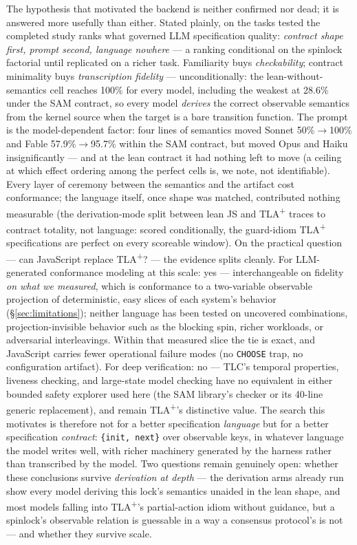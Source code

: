 \documentclass[11pt]{article}
\newcommand{\tlaplus}{TLA\texorpdfstring{\textsuperscript{+}}{+}}
\begin{document}
The hypothesis that motivated the backend is neither confirmed nor dead; it
is answered more usefully than either. Stated plainly, on the tasks tested
the completed study ranks what governed LLM specification quality:
\emph{contract shape first, prompt second, language nowhere} --- a ranking
conditional on the spinlock factorial until replicated on a richer task. Familiarity buys \emph{checkability};
contract minimality buys \emph{transcription fidelity} --- unconditionally:
the lean-without-semantics cell reaches 100\% for every model, including the
weakest at 28.6\% under the SAM contract, so every model \emph{derives} the
correct observable semantics from the kernel source when the target is a
bare transition function. The prompt is the model-dependent factor: four
lines of semantics moved Sonnet 50\%$\to$100\% and Fable 57.9\%$\to$95.7\%
within the SAM contract, but moved Opus and Haiku insignificantly --- and at
the lean contract it had nothing left to move (a ceiling at which effect
ordering among the perfect cells is, we note, not identifiable). Every layer
of ceremony between the semantics and the artifact cost conformance; the
language itself, once shape was matched, contributed nothing measurable
(the derivation-mode split between lean JS and \tlaplus{} traces to
contract totality, not language: scored conditionally, the guard-idiom
\tlaplus{} specifications are perfect on every scoreable window). On the
practical question --- can JavaScript replace
\tlaplus{}? --- the evidence splits cleanly. For LLM-generated conformance
modeling at this scale: yes --- interchangeable on fidelity \emph{on what we
measured}, which is conformance to a two-variable observable projection of
deterministic, easy slices of each system's behavior
(\S\ref{sec:limitations}); neither language has been tested on uncovered
combinations, projection-invisible behavior such as the blocking spin,
richer workloads, or adversarial interleavings. Within that measured slice
the tie is exact, and JavaScript carries fewer operational failure modes (no
\texttt{CHOOSE} trap, no configuration artifact). For deep verification: no --- TLC's temporal properties,
liveness checking, and large-state model checking have no equivalent in
either bounded safety explorer used here (the SAM library's checker or its
40-line generic replacement), and remain \tlaplus{}'s distinctive value. The search
this motivates is therefore not for a better specification \emph{language}
but for a better specification \emph{contract}:
\texttt{\{init, next\}} over observable keys, in whatever language the
model writes well, with richer machinery generated by the harness rather
than transcribed by the model. Two questions remain genuinely open:
whether these conclusions survive \emph{derivation at depth} --- the
derivation arms already run show every model deriving this lock's semantics
unaided in the lean shape, and most models falling into \tlaplus{}'s
partial-action idiom without guidance, but a spinlock's observable relation
is guessable in a way a consensus protocol's is not --- and whether they
survive scale.
\end{document}
